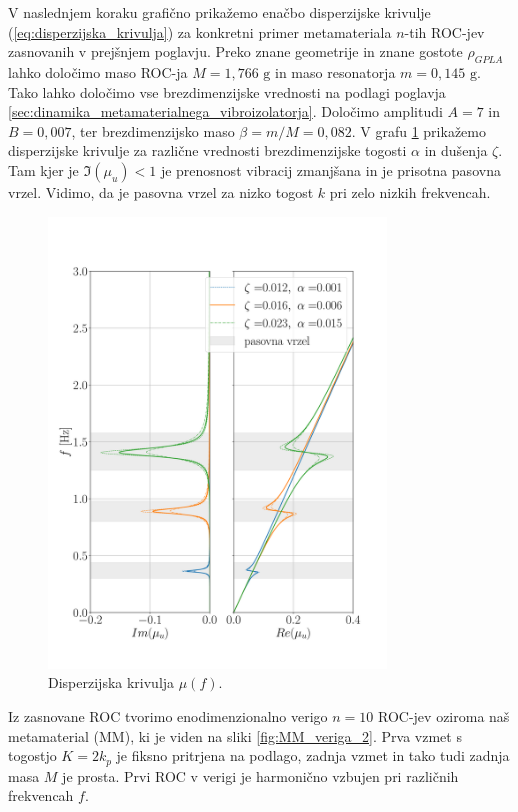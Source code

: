         V naslednjem koraku grafično prikažemo enačbo disperzijske krivulje (\ref{eq:disperzijska_krivulja}) za konkretni primer metamateriala $n$-tih ROC-jev zasnovanih v prejšnjem poglavju. Preko znane geometrije in znane gostote $\rho_{GPLA}$ lahko določimo maso ROC-ja $M=1,766\text{ g}$ in maso resonatorja $m=0,145\text{ g}$. Tako lahko določimo vse brezdimenzijske vrednosti na podlagi poglavja \ref{sec:dinamika_metamaterialnega_vibroizolatorja}. 
        Določimo amplitudi $A=7$ in $B=0,007$, ter brezdimenzijsko maso $\beta = m/M = 0,082$. V grafu \ref{fig:FRF_disperzijska} prikažemo disperzijske krivulje za različne vrednosti brezdimenzijske togosti $\alpha$ in dušenja $\zeta$. Tam kjer je $\Im(\mu_u)<1$ je prenosnost vibracij zmanjšana in je prisotna pasovna vrzel. Vidimo, da je pasovna vrzel za nizko togost $k$ pri zelo nizkih frekvencah.
        \begin{figure}[!hb]
            \centering
            \includegraphics[trim={0.0cm 0.0cm 0.0cm 3.0cm}, clip, width=0.8\textwidth]{Magisterski praktikum/slike/metodologija/FRF_disperzijska.pdf}
            \caption{Disperzijska krivulja $\mu(f)$.}\label{fig:FRF_disperzijska}
        \end{figure} 
        
        \newpage
        Iz zasnovane ROC tvorimo enodimenzionalno verigo $n=10$ ROC-jev oziroma naš metamaterial (MM), ki je viden na sliki \ref{fig:MM_veriga_2}. Prva vzmet s togostjo $K=2 k_p$ je fiksno pritrjena na podlago, zadnja vzmet in tako tudi zadnja masa $M$ je prosta. Prvi ROC v verigi je harmonično vzbujen pri različnih frekvencah $f$. 
        
